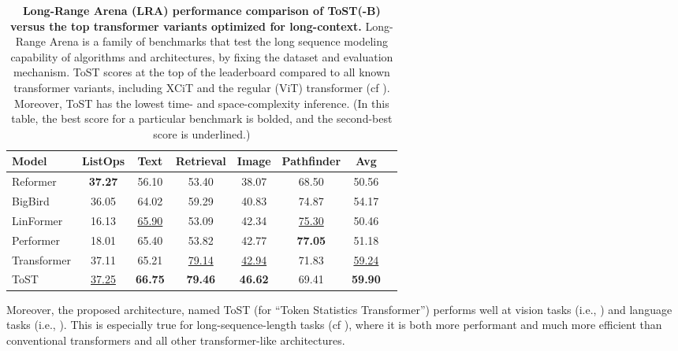 \documentclass[\toplevelprefix/book-main.tex]{subfiles}
\begin{document}
\begin{table}
    \centering
    
    \begin{tabular}{@{}lccccccc@{}}
            \toprule
            Model        & ListOps  & Text     & Retrieval & Image    & Pathfinder & Avg      \\
            \midrule
            \midrule
            Reformer              & \textbf{37.27} & 56.10             & 53.40              & 38.07             & 68.50               & 50.56             \\
            BigBird               & 36.05             & 64.02             & 59.29              & 40.83             & 74.87                & 54.17             \\
            LinFormer         & 16.13             & \underline{65.90} & 53.09              & 42.34             & \underline{75.30}               & 50.46             \\
            Performer             & 18.01             & 65.40             & 53.82              & 42.77             & \textbf{77.05}                & 51.18             \\
            Transformer           & 37.11             & 65.21             & \underline{79.14}              & \underline{42.94}             & 71.83              & \underline{59.24}            \\
            ToST & \underline{37.25}    & \textbf{66.75}    & \textbf{79.46}     & \textbf{46.62}    &    69.41      &     \textbf{59.90}\\
            
            \bottomrule
        \end{tabular}%
    \caption{\small \textbf{Long-Range Arena (LRA) performance comparison of ToST(-B) versus the top transformer variants optimized for long-context.} Long-Range Arena is a family of benchmarks that test the long sequence modeling capability of algorithms and architectures, by fixing the dataset and evaluation mechanism. ToST scores at the top of the leaderboard compared to all known transformer variants, including XCiT and the regular (ViT) transformer (cf ). Moreover, ToST has the lowest time- and space-complexity inference. (In this table, the best score for a particular benchmark is bolded, and the second-best score is underlined.)}
    \label{tab:tost_lra_results}
\end{table}

Moreover, the proposed architecture, named ToST (for ``Token Statistics Transformer'') performs well at vision tasks (i.e., ) and language tasks (i.e., ). This is especially true for long-sequence-length tasks (cf ), where it is both more performant and much more efficient than conventional transformers and all other transformer-like architectures.
\end{document}
